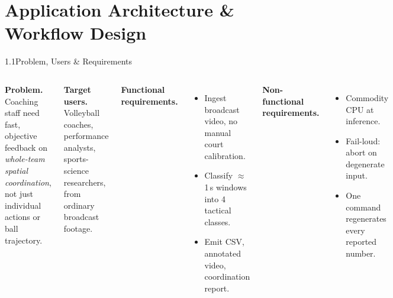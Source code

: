 \documentclass[aspectratio=169, 11pt]{beamer}
\begin{document}
\section{Application Architecture \& Workflow Design}

\begin{frame}[t]{1.1\quad Problem, Users \& Requirements}
    \small
    \begin{columns}[t]
        \textbf{Problem.} Coaching staff need fast, objective feedback on
        \emph{whole-team spatial coordination}, not just individual actions
        or ball trajectory.

        \vspace{0.2cm}
        \textbf{Target users.} Volleyball coaches, performance analysts,
        sports-science researchers, from ordinary broadcast footage.

        \textbf{Functional requirements.}
        \begin{itemize}
            \item Ingest broadcast video, no manual court calibration.
            \item Classify $\approx$1\,s windows into 4 tactical classes.
            \item Emit CSV, annotated video, coordination report.
        \end{itemize}
        \vspace{0.15cm}
        \textbf{Non-functional requirements.}
        \begin{itemize}
            \item Commodity CPU at inference.
            \item Fail-loud: abort on degenerate input.
            \item One command regenerates every reported number.
        \end{itemize}
    \end{columns}
\end{frame}
\end{document}
